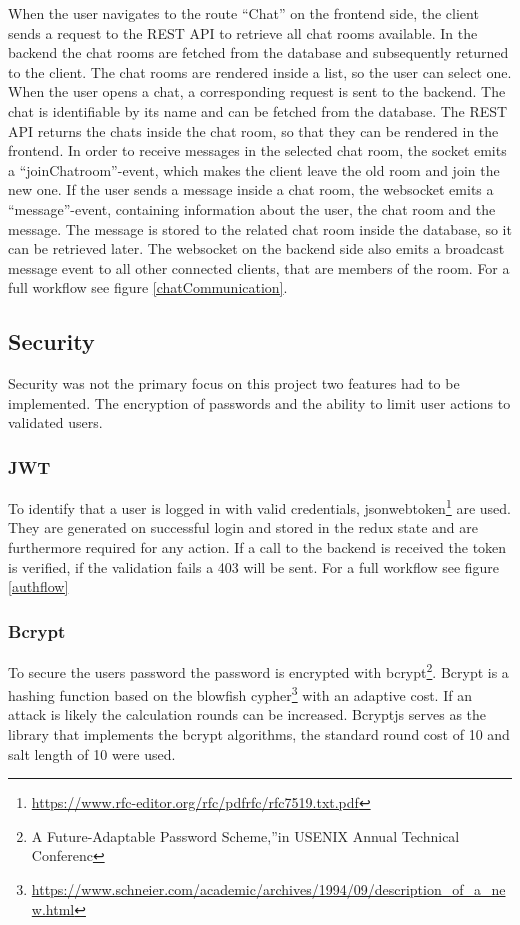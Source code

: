 When the user navigates  to the route “Chat” on the frontend side, the client sends a request to the REST API to retrieve all chat rooms available. In the backend the chat rooms are fetched from the database and subsequently returned to the client.
The chat rooms are rendered inside a list, so the user can select one.
When the user opens a chat, a corresponding request is sent to the backend. The chat is identifiable by its name and can be fetched from the database.
The REST API returns the chats inside the chat room, so that they can be rendered in the frontend.
In order to receive messages in the selected chat room, the socket emits a “joinChatroom”-event, which makes the client leave the old room and join the new one.
If the user sends a message inside a chat room, the websocket emits a “message”-event, containing information about the user, the chat room and the message. 
The message is stored to the related chat room inside the database, so it can be retrieved later.
The websocket on the backend side also emits a broadcast message event to all other connected clients, that are members of the room. For a full workflow see figure \ref{chatCommunication}.


\subsection{Security}
Security was not the primary focus on this project two features had to be implemented. The encryption of passwords and the ability to limit user actions to validated users. 
\subsubsection{JWT}
To identify that a user is logged in with valid credentials, jsonwebtoken\footnote{\url{https://www.rfc-editor.org/rfc/pdfrfc/rfc7519.txt.pdf}} are used. They are generated on successful login and stored in the redux state and are furthermore required for any action. If a call to the backend is received the token is verified, if the validation fails a 403 will be sent. For a full workflow see figure \ref{authflow}

\subsubsection{Bcrypt}
To secure the users password the password is encrypted with bcrypt\footnote{A  Future-Adaptable  Password  Scheme,”in USENIX Annual Technical Conferenc}. Bcrypt is a hashing function based on the blowfish cypher\footnote{\url{https://www.schneier.com/academic/archives/1994/09/description\_of\_a\_new.html}} with an adaptive cost. If an attack is likely the calculation rounds can be increased. Bcryptjs serves as the library that implements the bcrypt algorithms, the standard round cost of 10 and salt length of 10 were used.

